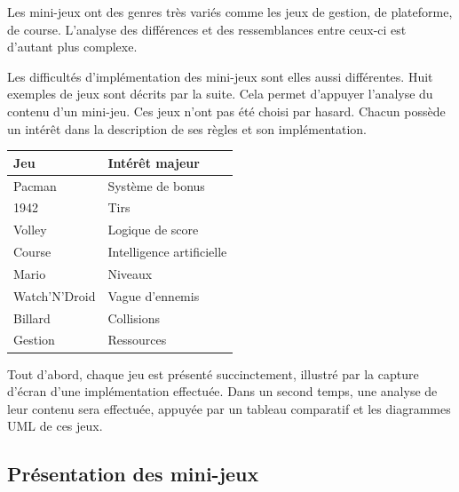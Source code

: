 Les mini-jeux ont des genres très variés comme les jeux de gestion, de plateforme, de course.
L'analyse des différences et des ressemblances entre ceux-ci est d'autant plus complexe.

Les difficultés d'implémentation des mini-jeux sont elles aussi différentes.
Huit exemples de jeux sont décrits par la suite.
Cela permet d'appuyer l'analyse du contenu d'un mini-jeu.
Ces jeux n'ont pas été choisi par hasard. Chacun possède un intérêt dans la description de ses règles et son implémentation. 


\begin{center}
\begin{tabular}{l|l}
 Jeu & Intérêt majeur \\
 \hline
 Pacman & Système de bonus \\
 1942 & Tirs \\
 Volley & Logique de score \\
 Course & Intelligence artificielle \\
 Mario & Niveaux \\
 Watch'N'Droid & Vague d'ennemis \\
 Billard & Collisions \\
 Gestion & Ressources \\
\end{tabular}
\end{center}

\vspace{0.5cm}

Tout d'abord, chaque jeu est présenté succinctement, illustré par la capture d'écran d'une implémentation effectuée.
Dans un second temps, une analyse de leur contenu sera effectuée, appuyée par un tableau comparatif et les diagrammes UML de ces jeux.

\clearpage

\subsection{Présentation des mini-jeux}


